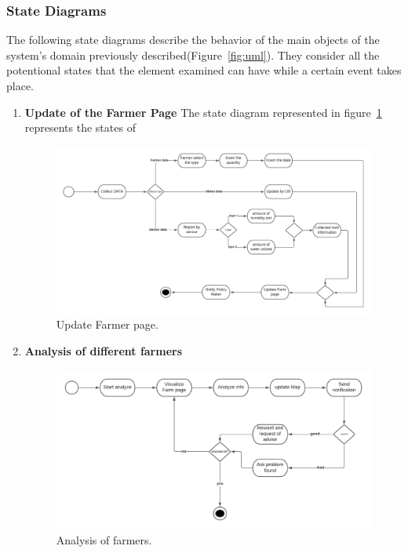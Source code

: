 \subsubsection{State Diagrams}
The following state diagrams describe the behavior of the main objects of the system's domain previously described(Figure~\ref{fig:uml}). 
They consider all the potentional states that the element examined can have 
while a certain event takes place.

\begin{enumerate}
    \item \textbf{Update of the Farmer Page}
        The state diagram represented in figure~\ref{fig:state1} represents the states of 

    \begin{figure}[H]
        \begin{center}
        \includegraphics[width=1\textwidth]{images/State chart 1.png}
        \caption{Update Farmer page.}
        \label{fig:state1}
        \end{center}
    \end{figure}

    \item \textbf{Analysis of different farmers}

    \begin{figure}[H]
        \begin{center}
        \includegraphics[width=1\textwidth]{images/State chart 2.png}
        \caption{Analysis of farmers.}
        \label{fig:state2}
        \end{center}
    \end{figure}


\end{enumerate}
